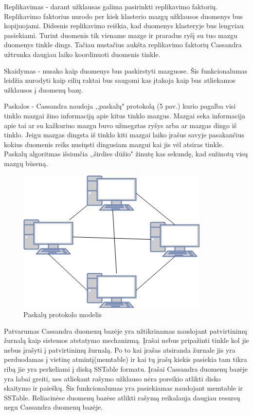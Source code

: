 \documentclass{VUMIFPSkursinis}
\begin{document}
Replikavimas - darant užklausas galima pasirinkti replikavimo faktorių. Replikavimo faktorius nurodo per kiek klasterio mazgų užklausos duomenys bus kopijuojami. Didesnis replikavimo reiškia, kad duomenys klasteryje bus lengviau pasiekiami. Turint duomenis tik viename mazge ir praradus ryšį su tuo mazgu duomenys tinkle dings. Tačiau nustačius aukšta replikavimo faktorių Cassandra užtrunka daugiau laiko koordinuoti duomenis tinkle. 
\par
Skaidymas - nusako kaip duomenys bus paskirstyti mazguose. Šis funkcionalumas leidžia nurodyti kaip eilių raktai bus saugomi kas įtakoja kaip bus atliekamos užklausos į duomenų bazę.
\par
Paskalos - Cassandra naudoja ,,paskalų" protokolą (5 pav.) kurio pagalba visi tinklo mazgai žino informaciją apie kitus tinklo mazgus. Mazgai seka informacija apie tai ar su kažkuriuo mazgu buvo užmegztas ryšys arba ar mazgas dingo iš tinklo. Jeigu mazgas dingsta iš tinklo kiti mazgai laiko įrašus savyje pasakančius kokius duomenis reiks nusiųsti dingusiam mazgui kai jis vėl atsiras tinkle. Paskalų algoritmas išsiunčia ,,širdies dūžio" žinutę kas sekundę, kad sužinotų visų mazgų būseną.
\begin{figure}[H]
\centering
\includegraphics[scale=0.6]{img/Gos}
\caption{Paskalų protokolo modelis} %
\label{img:mlp}
\end{figure}

Patvarumas Cassandra duomenų bazėje yra užtikrinamas naudojant patvirtinimų žurnalą kaip sistemos atstatymo mechanizmą. Įrašai nebus pripažinti tinkle kol jie nebus įrašyti į patvirtinimų žurnalą. Po to kai įrašas atsiranda žurnale jis yra perduodamas į vietinę atmintį(memtable) ir kai tų įrašų kiekis pasiekia tam tikra ribą jie yra perkeliami į diską SSTable formatu.
\linebreak
Įrašai Cassandra duomenų bazėje yra labai greiti, nes atliekant rašymo užklauso nėra poreikio atlikti disko skaitymo ir paieškų. Šis funkcionalumas yra pasiekiamas naudojant memtable ir SSTable. Reliacinėse duomenų bazėse atlikti rašymą reikalauja daugiau resursų negu Cassandra duomenų bazėje.
\end{document}
